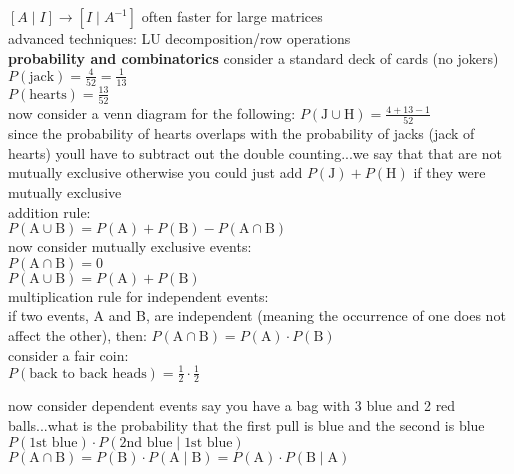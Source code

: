 \documentclass{article}
\begin{document}
$[A \mid I] \to [I \mid A^{-1}]$ often faster for large matrices\\

advanced techniques: LU decomposition/row operations\\

\textbf{probability and combinatorics}
consider a standard deck of cards (no jokers)\\
$P(\text{jack}) = \frac{4}{52} = \frac{1}{13}$\\
$P(\text{hearts}) = \frac{13}{52}$\\

now consider a venn diagram for the following:
$P(\text{J} \cup \text{H}) = \frac{4 + 13 - 1}{52}$\\
since the probability of hearts overlaps with the probability of jacks (jack of hearts) youll have to subtract out the double counting...we say that that are not mutually exclusive otherwise you could just add $P(\text{J}) + P(\text{H})$ if they were mutually exclusive\\

addition rule:\\
$P(\text{A} \cup \text{B}) = P(\text{A}) + P(\text{B}) - P(\text{A} \cap \text{B})$\\

now consider mutually exclusive events:\\
$P(\text{A} \cap \text{B}) = 0$\\
$P(\text{A} \cup \text{B}) = P(\text{A}) + P(\text{B})$\\

multiplication rule for independent events:\\
if two events, A and B, are independent (meaning the occurrence of one does not affect the other), then: $P(\text{A} \cap \text{B}) = P(\text{A}) \cdot P(\text{B})$\\

consider a fair coin:\\
$P(\text{back to back heads}) = \frac{1}{2} \cdot \frac{1}{2}$

now consider dependent events say you have a bag with 3 blue and 2 red balls...what is the probability that the first pull is blue and the second is blue\\
$P(\text{1st blue}) \cdot P(\text{2nd blue} \mid \text{1st blue})$\\

$P(\text{A} \cap \text{B}) = P(\text{B}) \cdot P(\text{A} \mid \text{B}) = P(\text{A}) \cdot P(\text{B} \mid \text{A})$\\
\end{document}
